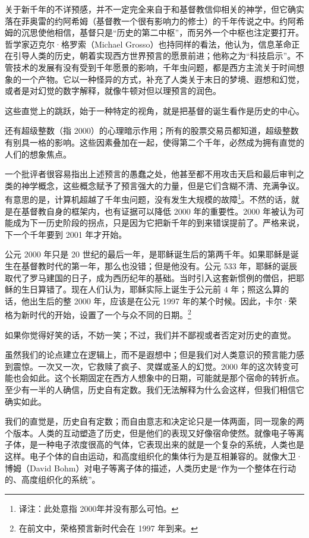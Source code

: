 关于新千年的不详预感，并不一定完全来自于和基督教信仰相关的神学，但它确实落在菲奥雷的约阿希姆（基督教一个很有影响力的修士）的千年传说之中。约阿希姆的沉思使他相信，基督只是“历史的第二中枢”，而另外一个中枢也注定要打开。哲学家迈克尔·格罗索（Michael Grosso）也持同样的看法，他认为，信息革命正在引导人类的历史，朝着实现西方世界预言的愿景前进；他称之为“科技启示”。不管技术的发展有没有受到千年愿景的影响，千年虫问题，都是西方主流关于时间想象的一个产物。它以一种怪异的方式，补充了人类关于末日的梦境、遐想和幻觉，或者是对幻觉的数字解释，就像牛顿对但以理预言的润色。


这些直觉上的跳跃，始于一种特定的视角，就是把基督的诞生看作是历史的中心。


还有超级整数（指 2000）的心理暗示作用；所有的股票交易员都知道，超级整数有别具一格的影响。这些因素叠加在一起，使得第二个千年，必然成为拥有直觉的人们的想象焦点。


一个批评者很容易指出上述预言的愚蠢之处，他甚至都不用攻击天启和最后审判之类的神学概念，这些概念赋予了预言强大的力量，但是它们含糊不清、充满争议。有意思的是，计算机超越了千年虫问题，没有发生大规模的故障\footnote{译注：此处意指 2000年并没有那么可怕。}。不然的话，就是在基督教自身的框架内，也有证据可以降低 2000 年的重要性。2000 年被认为可能成为下一历史阶段的拐点，只是因为它把新千年的到来错误提前了。严格来说，下一个千年要到 2001 年才开始。


公元 2000 年只是 20 世纪的最后一年，是耶稣诞生后的第两千年。如果耶稣是诞生在基督教时代的第一年，那么也没错；但是他没有。公元 533 年，耶稣的诞辰取代了罗马建国的日子，成为西历纪年的基础。当时引入这套新惯例的僧侣，把耶稣的生日算错了。现在人们认为，耶稣实际上诞生于公元前 4 年；照这么算的话，他出生后的整 2000 年，应该是在公元 1997 年的某个时候。因此，卡尔·荣格为新时代的开始，设置了一个与众不同的日期。\footnote{在前文中，荣格预言新时代会在 1997 年到来。}


如果你觉得好笑的话，不妨一笑；不过，我们并不鄙视或者否定对历史的直觉。


虽然我们的论点建立在逻辑上，而不是遐想中；但是我们对人类意识的预言能力感到震惊。一次又一次，它救赎了疯子、灵媒或圣人的幻觉。2000 年的这次转变可能也会如此。这个长期固定在西方人想象中的日期，可能就是那个宿命的转折点。至少有一半的人确信，历史自有定数。我们无法解释为什么会这样，但我们相信它确实如此。


我们的直觉是，历史自有定数；而自由意志和决定论只是一体两面，同一现象的两个版本。人类的互动塑造了历史，但是他们的表现又好像宿命使然。就像电子等离子体，是一种电子浓度很高的气体，它表现出来的就是一个复杂的系统，人类也是这样。电子个体的自由运动，和高度组织化的集体行为是互相兼容的。就像大卫·博姆（David Bohm）对电子等离子体的描述，人类历史是“作为一个整体在行动的、高度组织化的系统”。


